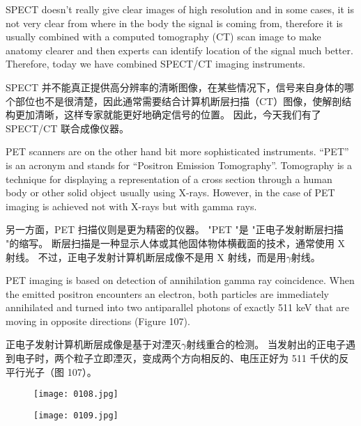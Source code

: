 \documentclass[dvipsnames, svgnames,a4paper,11pt]{article}
\begin{document}
SPECT doesn’t really give clear images of high resolution and in some cases, it is
not very clear from where in the body the signal is coming from, therefore it is usually
combined with a computed tomography (CT) scan image to make anatomy clearer
and then experts can identify location of the signal much better. Therefore, today we
have combined SPECT/CT imaging instruments.

SPECT 并不能真正提供高分辨率的清晰图像，在某些情况下，信号来自身体的哪个部位也不是很清楚，因此通常需要结合计算机断层扫描（CT）图像，使解剖结构更加清晰，这样专家就能更好地确定信号的位置。 因此，今天我们有了 SPECT/CT 联合成像仪器。

PET scanners are on the other hand bit more sophisticated instruments. “PET” is an
acronym and stands for “Positron Emission Tomography”. Tomography is a
technique for displaying a representation of a cross section through a human body or
other solid object usually using X-rays. However, in the case of PET imaging is
achieved not with X-rays but with gamma rays.

另一方面，PET 扫描仪则是更为精密的仪器。 "PET "是 "正电子发射断层扫描 "的缩写。 断层扫描是一种显示人体或其他固体物体横截面的技术，通常使用 X 射线。 不过，正电子发射计算机断层成像不是用 X 射线，而是用$\gamma$射线。

PET imaging is based on detection of annihilation gamma ray coincidence. When the
emitted positron encounters an electron, both particles are immediately annihilated
and turned into two antiparallel photons of exactly 511 keV that are moving in
opposite directions (Figure 107).

正电子发射计算机断层成像是基于对湮灭$\gamma$射线重合的检测。 当发射出的正电子遇到电子时，两个粒子立即湮灭，变成两个方向相反的、电压正好为 511 千伏的反平行光子（图 107）。

\begin{figure}[H]
    \centering
    \texttt{[image: 0108.jpg]}
     \label{fig107}
\end{figure}

\begin{figure}[H]
    \centering
    \texttt{[image: 0109.jpg]}
     \label{fig108}
\end{figure}
\end{document}
